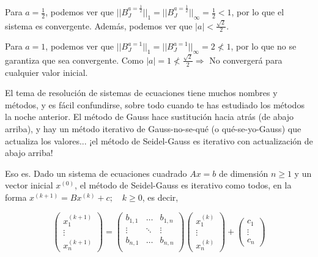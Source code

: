 \documentclass[12pt]{article}
\begin{document}
\begin{ejercicio} 
    Para $a=\frac{1}{2}$, podemos ver que $||B_J^{a=\frac{1}{2}}||_1 = ||B_J^{a=\frac{1}{2}}||_\infty = \frac{1}{2} < 1$, por lo que el sistema es convergente. Además, podemos ver que $|a|<\frac{\sqrt{2}}{2}$.

    Para $a=1$, podemos ver que $||B_J^{a=1}||_1 = ||B_J^{a=1}||_\infty = 2 \nless 1$, por lo que no se garantiza que sea convergente. Como $|a|=1\nless \frac{\sqrt{2}}{2} \Longrightarrow$ No convergerá para cualquier valor inicial.
\end{ejercicio}

\begin{ejercicio} 
     El tema de resolución de sistemas de ecuaciones tiene muchos nombres y métodos, y es fácil confundirse, sobre todo cuando te has estudiado los métodos la noche anterior. El método de Gauss hace sustitución hacia atrás (de abajo arriba), y hay un método iterativo de Gauss-no-se-qué (o qué-se-yo-Gauss) que actualiza los valores... ¡el método de Seidel-Gauss es iterativo con actualización de abajo arriba!
     
     Eso es. Dado un sistema de ecuaciones cuadrado $Ax = b$ de dimensión $n \geq 1$ y un vector inicial $x^{(0)}$, el método de Seidel-Gauss es iterativo como todos, en la forma $x^{(k+1)} = B x^{(k)} + c;\quad k \geq 0$, es decir,

     \begin{equation*}
         \left( \begin{array}{c}
            x_1^{(k+1)} \\
            \vdots \\
            x_n^{(k+1)}
         \end{array} \right) =
         \left( \begin{array}{ccc}
            b_{1,1} & \dots & b_{1,n} \\
            \vdots & \ddots & \vdots \\
            b_{n,1} & \dots & b_{n,n} \\
         \end{array} \right)  \left( \begin{array}{c}
            x_1^{(k)} \\
            \vdots \\
            x_{n}^{(k)}
         \end{array} \right)
         + \left( \begin{array}{c}
            c_1 \\
            \vdots \\
            c_n
         \end{array} \right)
     \end{equation*}


\end{ejercicio}
\end{document}
